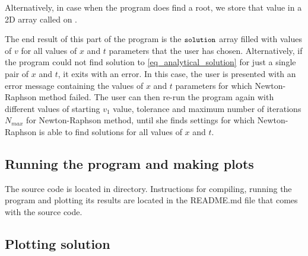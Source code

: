 Alternatively, in case when the program does find a root, we store that value in a 2D array called  on .

The end result of this part of the program is the $\texttt{\small solution}$ array filled with values of $v$ for all values of $x$ and $t$ parameters that the user has chosen. Alternatively, if the program could not find solution to \autoref{eq_analytical_solution} for just a single pair of $x$ and $t$, it exits with an error. In this case, the user is presented with an error message containing the values of $x$ and $t$ parameters for which Newton-Raphson method failed. The user can then re-run the program again with different values of starting $v_1$ value, tolerance and maximum number of iterations $N_{max}$ for Newton-Raphson method, until she finds settings for which Newton-Raphson is able to find solutions for all values of $x$ and $t$.



\subsection{Running the program and making plots}

The source code is located in  directory. Instructions for compiling, running the program and plotting its results are located in the README.md file that comes with the source code.


\subsection{Plotting solution}

